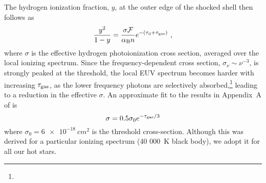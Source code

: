 The hydrogen ionization fraction, \(y\), at the outer edge of the shocked
shell then follows as
\begin{equation}
  \label{eq:outer-shell-ionization-balance}
  \frac{y^2}{1 - y} = \frac{\sigma \mathcal{F}}{\alpha_{\text{B}} n} e^{-(\tau_{\text{d}} + \tau_{\text{gas}})} \ ,
\end{equation}
where \(\sigma\) is the effective hydrogen photoionization cross section,
averaged over the local ionizing spectrum.  Since the
frequency-dependent cross section, \(\sigma_\nu \sim \nu^{-3}\), is strongly
peaked at the threshold, the local EUV spectrum becomes harder with
increasing \(\tau_{\text{gas}}\), as the lower frequency photons are selectively
absorbed,\footnote{} leading to a reduction in the effective
\(\sigma\).  An approximate fit to the results in Appendix~A of
\citet{Henney:2005b} is
\begin{equation}
  \label{eq:sigma-vs-tau}
  \sigma = 0.5 \sigma_0 e^{-\tau_{\text{gas}}/3}
\end{equation}
where \(\sigma_0 = \SI{6e-18}{cm^2}\) is the threshold cross-section.
Although this was derived for a particular ionizing spectrum (\SI{40
  000}{K} black body), we adopt it for all our hot stars.



